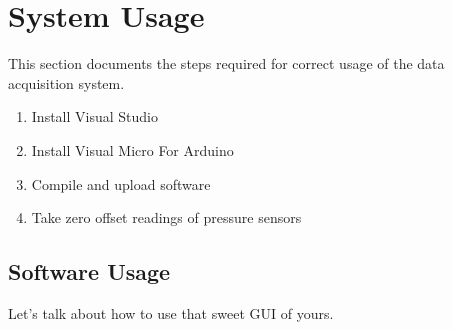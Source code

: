 \chapter{System Usage}
This section documents the steps required for correct usage of the data acquisition system.

\begin{enumerate}
\item Install Visual Studio
\item Install Visual Micro For Arduino
\item Compile and upload software
\item Take zero offset readings of pressure sensors
\end{enumerate}

\section{Software Usage}
Let's talk about how to use that sweet GUI of yours.
